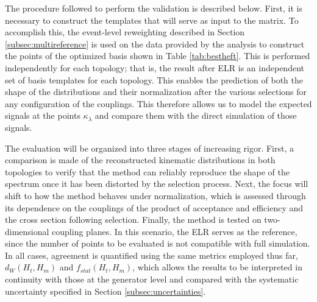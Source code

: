 
The procedure followed to perform the validation is described below. First, it is necessary to construct the templates that will serve as input to the matrix. To accomplish this, the event-level reweighting described in Section \ref{subsec:multireference} is used on the data provided by the analysis to construct the points of the optimized basis shown in Table \ref{tab:bestheft}. This is performed independently for each topology; that is, the result after ELR is an independent set of basis templates for each topology. This enables the prediction of both the shape of the distributions and their normalization after the various selections for any configuration of the couplings. This therefore allows us to model the expected signals at the points $\kappa_\lambda$ and compare them with the direct simulation of those signals.

The evaluation will be organized into three stages of increasing rigor. First, a comparison is made of the reconstructed kinematic distributions in both topologies to verify that the method can reliably reproduce the shape of the spectrum once it has been distorted by the selection process. Next, the focus will shift to how the method behaves under normalization, which is assessed through its dependence on the couplings of the product of acceptance and efficiency and the cross section following selection. Finally, the method is tested on two-dimensional coupling planes. In this scenario, the ELR serves as the reference, since the number of points to be evaluated is not compatible with full simulation. In all cases, agreement is quantified using the same metrics employed thus far, $d_W(H_{t},H_{m})$ and $f_{stat}(H_{t},H_{m})$, which allows the results to be interpreted in continuity with those at the generator level and compared with the systematic uncertainty specified in Section \ref {subsec:uncertainties}.\\

